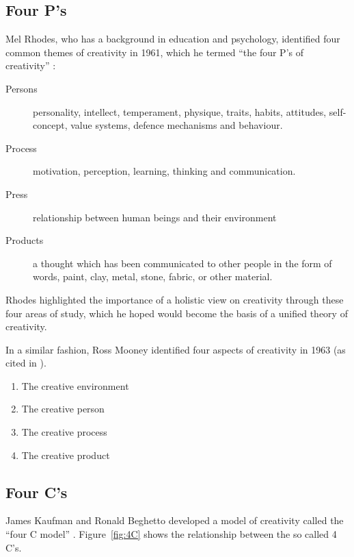 \subsection{Four P's}
\label{s:fourp}

Mel Rhodes, who has a background in education and psychology, identified four common themes of creativity in 1961, which he termed ``the four P\rq s of creativity'' \citeyear{Rhodes1961}:

\begin{description}
  \item [Persons] personality, intellect, temperament, physique, traits, habits, attitudes, self-concept, value systems, defence mechanisms and behaviour.
  \item [Process] motivation, perception, learning, thinking and communication.
  \item [Press] relationship between human beings and their environment
  \item [Products] a thought which has been communicated to other people in the form of words, paint, clay, metal, stone, fabric, or other material.
\end{description}

Rhodes highlighted the importance of a holistic view on creativity through these four areas of study, which he hoped would become the basis of a unified theory of creativity.

In a similar fashion, Ross Mooney identified four aspects of creativity in 1963 (as cited in \autocite{Sternberg1999}).

\begin{enumerate}
  \item The creative environment
  \item The creative person
  \item The creative process
  \item The creative product
\end{enumerate}


\subsection{Four C's}
\label{s:fourc}

James Kaufman and Ronald Beghetto developed a model of creativity called the ``four C model'' \citeyear{Kaufman2009}. Figure~\ref{fig:4C} shows the relationship between the so called 4 C's.

